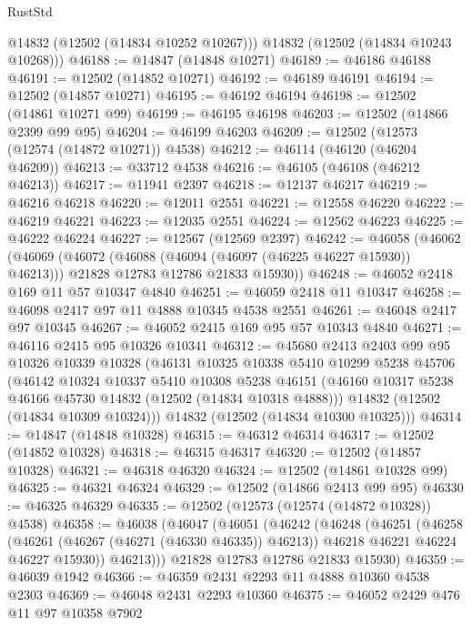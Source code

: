\begin{lexlean}{RustStd}
\begin{coremodule}
        @14832
        (@12502 (@14834 @10252 @10267)))
      @14832
      (@12502 (@14834 @10243 @10268)))
@46188 := @14847 (@14848 @10271)
@46189 := @46186 @46188
@46191 := @12502 (@14852 @10271)
@46192 := @46189 @46191
@46194 := @12502 (@14857 @10271)
@46195 := @46192 @46194
@46198 := @12502 (@14861 @10271 @99)
@46199 := @46195 @46198
@46203 := @12502 (@14866 @2399 @99 @95)
@46204 := @46199 @46203
@46209 := @12502 (@12573 (@12574 (@14872 @10271)) @4538)
@46212 := @46114 (@46120 (@46204 @46209))
@46213 := @33712 @4538
@46216 := @46105 (@46108 (@46212 @46213))
@46217 := @11941 @2397
@46218 := @12137 @46217
@46219 := @46216 @46218
@46220 := @12011 @2551
@46221 := @12558 @46220
@46222 := @46219 @46221
@46223 := @12035 @2551
@46224 := @12562 @46223
@46225 := @46222 @46224
@46227 := @12567 (@12569 @2397)
@46242 := @46058
    (@46062
      (@46069
        (@46072 (@46088 (@46094 (@46097 (@46225 @46227 @15930)) @46213)))
        @21828
        @12783
        @12786
        @21833
        @15930))
@46248 := @46052 @2418 @169 @11 @57 @10347 @4840
@46251 := @46059 @2418 @11 @10347
@46258 := @46098 @2417 @97 @11 @4888 @10345 @4538 @2551
@46261 := @46048 @2417 @97 @10345
@46267 := @46052 @2415 @169 @95 @57 @10343 @4840
@46271 := @46116 @2415 @95 @10326 @10341
@46312 := @45680
    @2413
    @2403
    @99
    @95
    @10326
    @10339
    @10328
    (@46131
      @10325
      @10338
      @5410
      @10299
      @5238
      @45706
      (@46142
        @10324
        @10337
        @5410
        @10308
        @5238
        @46151
        (@46160 @10317 @5238 @46166 @45730 @14832 (@12502 (@14834 @10318 @4888)))
        @14832
        (@12502 (@14834 @10309 @10324)))
      @14832
      (@12502 (@14834 @10300 @10325)))
@46314 := @14847 (@14848 @10328)
@46315 := @46312 @46314
@46317 := @12502 (@14852 @10328)
@46318 := @46315 @46317
@46320 := @12502 (@14857 @10328)
@46321 := @46318 @46320
@46324 := @12502 (@14861 @10328 @99)
@46325 := @46321 @46324
@46329 := @12502 (@14866 @2413 @99 @95)
@46330 := @46325 @46329
@46335 := @12502 (@12573 (@12574 (@14872 @10328)) @4538)
@46358 := @46038
    (@46047
      (@46051
        (@46242
          (@46248
            (@46251
              (@46258
                (@46261 (@46267 (@46271 (@46330 @46335)) @46213))
                @46218
                @46221
                @46224
                @46227
                @15930))
            @46213)))
      @21828
      @12783
      @12786
      @21833
      @15930)
@46359 := @46039 @1942
@46366 := @46359 @2431 @2293 @11 @4888 @10360 @4538 @2303
@46369 := @46048 @2431 @2293 @10360
@46375 := @46052 @2429 @476 @11 @97 @10358 @7902

\end{coremodule}
\end{lexlean}
